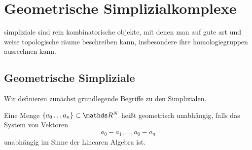 





\section{Geometrische Simplizialkomplexe}

simpliziale sind rein kombinatorische objekte, mit denen man auf gute
art und weise topologische räume beschreiben kann, insbesondere ihre
homologiegruppen ausrechnen kann.

\subsection{Geometrische Simpliziale}


Wir definieren zunächst grundlegende Begriffe zu den Simplizialen.

\begin{Def}
  Eine Menge $\{ a_0\ldots a_n \} \subset \R^N$ heißt geometrisch
  unabhängig, falls das System von Vektoren
  \begin{gather*}
    a_0 - a_1 , \ldots , a_0 - a_n
  \end{gather*}
  unabhängig im Sinne der Linearen Algebra ist.
\end{Def}


